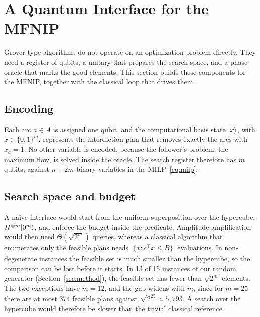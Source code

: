 \section{A Quantum Interface for the MFNIP}\label{sec:interface}

Grover-type algorithms do not operate on an optimization problem directly. They need a register of qubits, a unitary that prepares the search space, and a phase oracle that marks the good elements. This section builds these components for the MFNIP, together with the classical loop that drives them.

\subsection{Encoding}
Each arc $a\in A$ is assigned one qubit, and the computational basis state $\lvert x \rangle$, with $x\in\{0,1\}^m$, represents the interdiction plan that removes exactly the arcs with $x_a=1$. No other variable is encoded, because the follower's problem, the maximum flow, is solved inside the oracle. The search register therefore has $m$ qubits, against $n+2m$ binary variables in the MILP~\eqref{eq:milp}.

\subsection{Search space and budget}\label{sec:interface-space}
A naive interface would start from the uniform superposition over the hypercube, $H^{\otimes m}\lvert 0^m \rangle$, and enforce the budget inside the predicate. Amplitude amplification would then need $\Theta(\sqrt{2^m})$ queries, whereas a classical algorithm that enumerates only the feasible plans needs $|\{x : c^\top x\le B\}|$ evaluations. In non-degenerate instances the feasible set is much smaller than the hypercube, so the comparison can be lost before it starts. In 13 of 15 instances of our random generator (Section~\ref{sec:method}), the feasible set has fewer than $\sqrt{2^m}$ elements. The two exceptions have $m=12$, and the gap widens with $m$, since for $m=25$ there are at most 374 feasible plans against $\sqrt{2^{25}}\approx 5{,}793$. A search over the hypercube would therefore be slower than the trivial classical reference.

